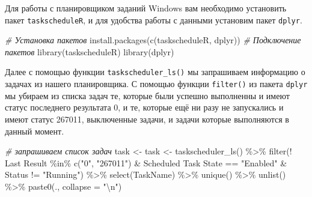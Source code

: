 \documentclass[
]{book}
\newenvironment{Shaded}{\begin{snugshade}}{\end{snugshade}}
\newcommand{\AttributeTok}[1]{\textcolor[rgb]{0.77,0.63,0.00}{#1}}
\newcommand{\CommentTok}[1]{\textcolor[rgb]{0.56,0.35,0.01}{\textit{#1}}}
\newcommand{\FunctionTok}[1]{\textcolor[rgb]{0.00,0.00,0.00}{#1}}
\newcommand{\NormalTok}[1]{#1}
\newcommand{\OtherTok}[1]{\textcolor[rgb]{0.56,0.35,0.01}{#1}}
\newcommand{\SpecialCharTok}[1]{\textcolor[rgb]{0.00,0.00,0.00}{#1}}
\newcommand{\StringTok}[1]{\textcolor[rgb]{0.31,0.60,0.02}{#1}}
\begin{document}
Для работы с планировщиком заданий Windows вам необходимо установить пакет \texttt{taskscheduleR}, и для удобства работы с данными установим пакет \texttt{dplyr}.

\begin{Shaded}
\begin{Highlighting}[]
\CommentTok{\# Установка пакетов}
\FunctionTok{install.packages}\NormalTok{(}\FunctionTok{c}\NormalTok{(}\StringTok{\textquotesingle{}taskscheduleR\textquotesingle{}}\NormalTok{, }\StringTok{\textquotesingle{}dplyr\textquotesingle{}}\NormalTok{))}
\CommentTok{\# Подключение пакетов}
\FunctionTok{library}\NormalTok{(taskscheduleR)}
\FunctionTok{library}\NormalTok{(dplyr)}
\end{Highlighting}
\end{Shaded}

Далее с помощью функции \texttt{taskscheduler\_ls()} мы запрашиваем информацию о задачах из нашего планировщика. С помощью функции \texttt{filter()} из пакета \texttt{dplyr} мы убираем из списка задач те, которые были успешно выполненны и имеют статус последнего результата 0, и те, которые ещё ни разу не запускались и имеют статус 267011, выключенные задачи, и задачи которые выполняются в данный момент.

\begin{Shaded}
\begin{Highlighting}[]
\CommentTok{\# запрашиваем список задач}
\NormalTok{task }\OtherTok{\textless{}{-}}\NormalTok{ task }\OtherTok{\textless{}{-}} \FunctionTok{taskscheduler\_ls}\NormalTok{() }\SpecialCharTok{\%\textgreater{}\%}
        \FunctionTok{filter}\NormalTok{(}\SpecialCharTok{!} \StringTok{\textasciigrave{}}\AttributeTok{Last Result}\StringTok{\textasciigrave{}}  \SpecialCharTok{\%in\%} \FunctionTok{c}\NormalTok{(}\StringTok{"0"}\NormalTok{, }\StringTok{"267011"}\NormalTok{) }\SpecialCharTok{\&} 
               \StringTok{\textasciigrave{}}\AttributeTok{Scheduled Task State}\StringTok{\textasciigrave{}} \SpecialCharTok{==} \StringTok{"Enabled"} \SpecialCharTok{\&} 
\NormalTok{               Status }\SpecialCharTok{!=} \StringTok{"Running"}\NormalTok{) }\SpecialCharTok{\%\textgreater{}\%}
        \FunctionTok{select}\NormalTok{(TaskName) }\SpecialCharTok{\%\textgreater{}\%}
        \FunctionTok{unique}\NormalTok{() }\SpecialCharTok{\%\textgreater{}\%}
        \FunctionTok{unlist}\NormalTok{() }\SpecialCharTok{\%\textgreater{}\%}
        \FunctionTok{paste0}\NormalTok{(., }\AttributeTok{collapse =} \StringTok{"}\SpecialCharTok{\textbackslash{}n}\StringTok{"}\NormalTok{)}
\end{Highlighting}
\end{Shaded}
\end{document}
